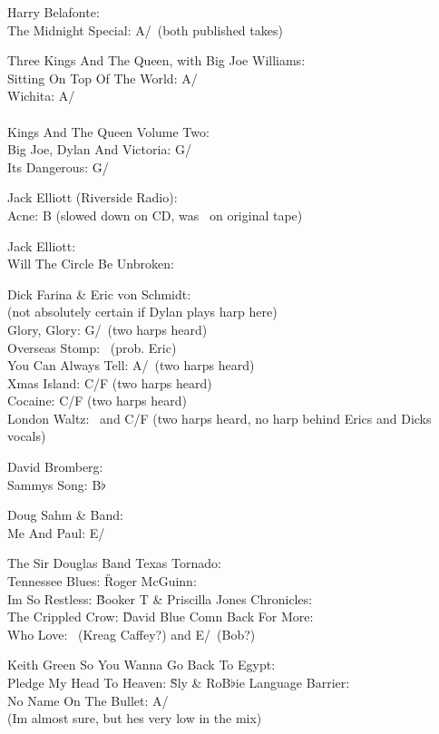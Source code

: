 Harry Belafonte: \\ The Midnight Special: A/\D\ (both published takes)


Three Kings And The Queen, with Big Joe Williams: \\ Sitting On Top Of
The World: A/\D\\ Wichita: A/\D\\
\\
Kings And The Queen Volume Two: \\ Big Joe, Dylan And Victoria: G/\C\\
Its Dangerous: G/\C


Jack Elliott (Riverside Radio): \\ Acne: B (slowed down on CD, was
\C\ on original tape)


Jack Elliott: \\ Will The Circle Be Unbroken: \D


Dick Farina \& Eric von Schmidt: \\ (not absolutely certain if Dylan
plays harp here)\\ Glory, Glory: G/\C\ (two harps heard)\\ Overseas
Stomp: \C\ (prob. Eric)\\ You Can Always Tell: A/\D\ (two harps heard)\\
Xmas Island: C/F (two harps heard)\\ Cocaine: C/F (two harps heard)\\
London Waltz: \C\ and C/F (two harps heard, no harp behind Erics and
Dicks vocals)


David Bromberg: \\ Sammys Song: B$\flat$


Doug Sahm \& Band: \\ Me And Paul: E/\A


The Sir Douglas Band Texas Tornado: \\ Tennessee Blues: \G


Roger McGuinn: \\ Im So Restless: \G


Booker T \& Priscilla Jones Chronicles: \\ The Crippled Crow: \G


David Blue Comn Back For More: \\ Who Love: \E\ (Kreag Caffey?) and
E/\A\ (Bob?)


Keith Green So You Wanna Go Back To Egypt: \\ Pledge My Head To
Heaven: \G


Sly \& RoB$\flat$ie Language Barrier: \\ No Name On The Bullet: A/\G\\
(Im almost sure, but hes very low in the mix)


